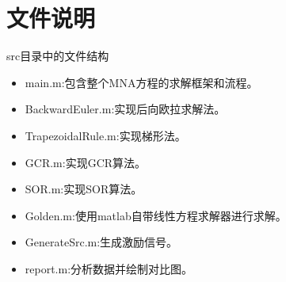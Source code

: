 \documentclass[12pt]{article}
\begin{document}
\begin{sloppypar}
\section{文件说明}
\qquad src目录中的文件结构
\begin{itemize}
  \item main.m:包含整个MNA方程的求解框架和流程。
  \item BackwardEuler.m:实现后向欧拉求解法。
  \item TrapezoidalRule.m:实现梯形法。
  \item GCR.m:实现GCR算法。
  \item SOR.m:实现SOR算法。
  \item Golden.m:使用matlab自带线性方程求解器进行求解。
  \item GenerateSrc.m:生成激励信号。
  \item report.m:分析数据并绘制对比图。
\end{itemize}

\end{sloppypar}
\end{document}
